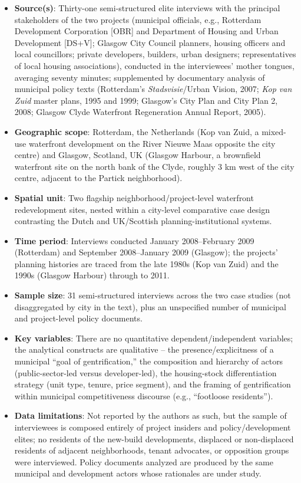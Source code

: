 \begin{itemize}
  \item \textbf{Source(s)}: Thirty-one semi-structured elite interviews with the principal stakeholders of the two projects (municipal officials, e.g., Rotterdam Development Corporation [OBR] and Department of Housing and Urban Development [DS+V]; Glasgow City Council planners, housing officers and local councillors; private developers, builders, urban designers; representatives of local housing associations), conducted in the interviewees' mother tongues, averaging seventy minutes; supplemented by documentary analysis of municipal policy texts (Rotterdam's \emph{Stadsvisie}/Urban Vision, 2007; \emph{Kop van Zuid} master plans, 1995 and 1999; Glasgow's City Plan and City Plan 2, 2008; Glasgow Clyde Waterfront Regeneration Annual Report, 2005).
  \item \textbf{Geographic scope}: Rotterdam, the Netherlands (Kop van Zuid, a mixed-use waterfront development on the River Nieuwe Maas opposite the city centre) and Glasgow, Scotland, UK (Glasgow Harbour, a brownfield waterfront site on the north bank of the Clyde, roughly 3 km west of the city centre, adjacent to the Partick neighborhood).
  \item \textbf{Spatial unit}: Two flagship neighborhood/project-level waterfront redevelopment sites, nested within a city-level comparative case design contrasting the Dutch and UK/Scottish planning-institutional systems.
  \item \textbf{Time period}: Interviews conducted January 2008--February 2009 (Rotterdam) and September 2008--January 2009 (Glasgow); the projects' planning histories are traced from the late 1980s (Kop van Zuid) and the 1990s (Glasgow Harbour) through to 2011.
  \item \textbf{Sample size}: 31 semi-structured interviews across the two case studies (not disaggregated by city in the text), plus an unspecified number of municipal and project-level policy documents.
  \item \textbf{Key variables}: There are no quantitative dependent/independent variables; the analytical constructs are qualitative -- the presence/explicitness of a municipal ``goal of gentrification,'' the composition and hierarchy of actors (public-sector-led versus developer-led), the housing-stock differentiation strategy (unit type, tenure, price segment), and the framing of gentrification within municipal competitiveness discourse (e.g., ``footloose residents'').
  \item \textbf{Data limitations}: Not reported by the authors as such, but the sample of interviewees is composed entirely of project insiders and policy/development elites; no residents of the new-build developments, displaced or non-displaced residents of adjacent neighborhoods, tenant advocates, or opposition groups were interviewed. Policy documents analyzed are produced by the same municipal and development actors whose rationales are under study.
\end{itemize}

